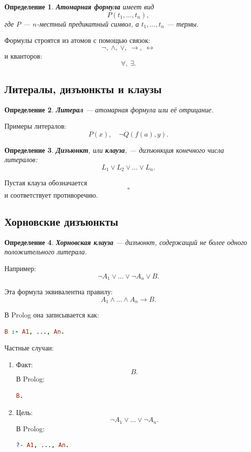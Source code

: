 \documentclass[12pt,a4paper]{article}
\newtheorem{definition}{Определение}
\begin{document}
\begin{definition}
\textbf{Атомарная формула} имеет вид
$$
P(t_1,\dots,t_n),
$$
где $P$ --- $n$-местный предикатный символ, а $t_1,\dots,t_n$ --- термы.
\end{definition}

Формулы строятся из атомов с помощью связок:
$$
\neg,\ \land,\ \lor,\ \to,\ \leftrightarrow
$$
и кванторов:
$$
\forall,\ \exists.
$$

\subsection{Литералы, дизъюнкты и клаузы}

\begin{definition}
\textbf{Литерал} --- атомарная формула или её отрицание.
\end{definition}

Примеры литералов:
$$
P(x),\quad \neg Q(f(a),y).
$$

\begin{definition}
\textbf{Дизъюнкт}, или \textbf{клауза}, --- дизъюнкция конечного числа литералов:
$$
L_1 \lor L_2 \lor \dots \lor L_n.
$$
\end{definition}

Пустая клауза обозначается
$$
\square
$$
и соответствует противоречию.

\subsection{Хорновские дизъюнкты}

\begin{definition}
\textbf{Хорновская клауза} --- дизъюнкт, содержащий не более одного положительного литерала.
\end{definition}

Например:
$$
\neg A_1 \lor \dots \lor \neg A_n \lor B.
$$

Эта формула эквивалентна правилу:
$$
A_1 \land \dots \land A_n \to B.
$$

В Prolog она записывается как:
\begin{lstlisting}[language=Prolog]
B :- A1, ..., An.
\end{lstlisting}

Частные случаи:
\begin{enumerate}
    \item Факт:
    $$
    B.
    $$
    В Prolog:
\begin{lstlisting}[language=Prolog]
B.
\end{lstlisting}

    \item Цель:
    $$
    \neg A_1 \lor \dots \lor \neg A_n.
    $$
    В Prolog:
\begin{lstlisting}[language=Prolog]
?- A1, ..., An.
\end{lstlisting}
\end{enumerate}
\end{document}
